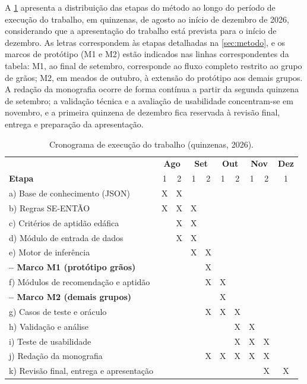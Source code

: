 A \cref{tab:cronograma} apresenta a distribuição das etapas do método
ao longo do período de execução do trabalho, em quinzenas, de agosto ao
início de dezembro de 2026, considerando que a apresentação do trabalho
está prevista para o início de dezembro. As letras correspondem às
etapas detalhadas na \cref{sec:metodo}, e os marcos de protótipo (M1 e
M2) estão indicados nas linhas correspondentes da tabela: M1, ao final
de setembro, corresponde ao fluxo completo restrito ao grupo de grãos;
M2, em meados de outubro, à extensão do protótipo aos demais grupos. A
redação da monografia ocorre de forma contínua a partir da segunda
quinzena de setembro; a validação técnica e a avaliação de usabilidade
concentram-se em novembro, e a primeira quinzena de dezembro fica
reservada à revisão final, entrega e preparação da apresentação.

\begin{table}[htb!]
\centering
\caption{\label{tab:cronograma}Cronograma de execução do trabalho (quinzenas, 2026).}
\small
\begin{tabular}{l c c c c c c c c c}
\hline
 & \multicolumn{2}{c}{\textbf{Ago}} & \multicolumn{2}{c}{\textbf{Set}} & \multicolumn{2}{c}{\textbf{Out}} & \multicolumn{2}{c}{\textbf{Nov}} & \textbf{Dez} \\
\textbf{Etapa} & 1 & 2 & 1 & 2 & 1 & 2 & 1 & 2 & 1 \\
\hline
a) Base de conhecimento (JSON)            & X & X &   &   &   &   &   &   &   \\
b) Regras SE-ENTÃO                        & X & X & X &   &   &   &   &   &   \\
c) Critérios de aptidão edáfica           &   & X & X &   &   &   &   &   &   \\
d) Módulo de entrada de dados             &   & X & X &   &   &   &   &   &   \\
e) Motor de inferência                    &   &   & X & X &   &   &   &   &   \\
\textbf{-- Marco M1 (protótipo grãos)}    &   &   &   & X &   &   &   &   &   \\
f) Módulos de recomendação e aptidão      &   &   &   & X & X &   &   &   &   \\
\textbf{-- Marco M2 (demais grupos)}      &   &   &   &   & X &   &   &   &   \\
g) Casos de teste e oráculo               &   &   &   & X & X & X &   &   &   \\
h) Validação e análise                    &   &   &   &   &   & X & X &   &   \\
i) Teste de usabilidade                   &   &   &   &   &   & X & X & X &   \\
j) Redação da monografia                  &   &   &   & X & X & X & X & X &   \\
k) Revisão final, entrega e apresentação  &   &   &   &   &   &   &   & X & X \\
\hline
\end{tabular}
\end{table}

